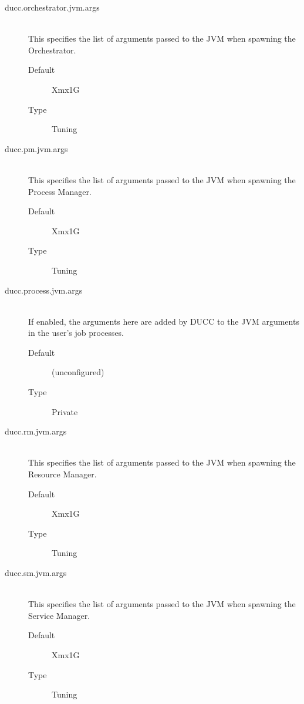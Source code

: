 \begin{description}
       \item[ducc.orchestrator.jvm.args] \hfill \\
         This specifies the list of arguments passed to the JVM when spawning the Orchestrator. 
         \begin{description}
           \item[Default] Xmx1G 
           \item[Type] Tuning 
         \end{description}


       \item[ducc.pm.jvm.args] \hfill \\
         This specifies the list of arguments passed to the JVM when spawning the Process Manager. 
         \begin{description}
           \item[Default] Xmx1G 
           \item[Type] Tuning 
         \end{description}

       \item[ducc.process.jvm.args] \hfill \\
         If enabled, the arguments here are added by DUCC to the JVM arguments in the user's job 
         processes. 
         \begin{description}
           \item[Default] (unconfigured) 
           \item[Type] Private 
         \end{description}
                   
       \item[ducc.rm.jvm.args] \hfill \\
         This specifies the list of arguments passed to the JVM when spawning the Resource 
         Manager. 
         \begin{description}           
           \item[Default] Xmx1G 
           \item[Type] Tuning 
         \end{description}

       \item[ducc.sm.jvm.args] \hfill \\
         This specifies the list of arguments passed to the JVM when spawning the Service Manager. 
         \begin{description}
           \item[Default] Xmx1G 
           \item[Type] Tuning 
         \end{description}


\end{description}
